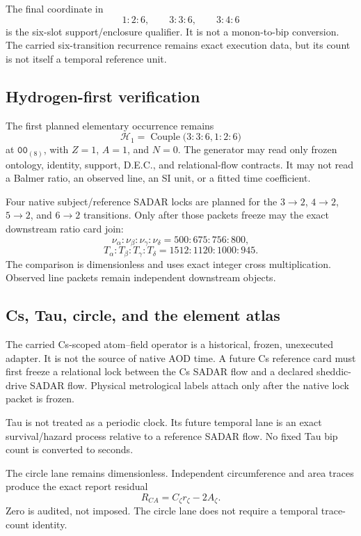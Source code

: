 The final coordinate in
\[
1{:}2{:}6,\qquad 3{:}3{:}6,\qquad 3{:}4{:}6
\]
is the six-slot support/enclosure qualifier.  It is not a monon-to-bip
conversion.  The carried six-transition recurrence remains exact execution
data, but its count is not itself a temporal reference unit.

\subsection{Hydrogen-first verification}

The first planned elementary occurrence remains
\[
\boxed{
\mathcal H_1=
\operatorname{Couple}
\bigl(3{:}3{:}6,1{:}2{:}6\bigr)
}
\]
at \(\mathtt{00}_{(8)}\), with \(Z=1\), \(A=1\), and \(N=0\).
The generator may read only frozen ontology, identity, support, D.E.C., and
relational-flow contracts.  It may not read a Balmer ratio, an observed line,
an SI unit, or a fitted time coefficient.

Four native subject/reference SADAR locks are planned for the
\(3\to2\), \(4\to2\), \(5\to2\), and \(6\to2\) transitions.  Only after
those packets freeze may the exact downstream ratio card join:
\[
\nu_\alpha:\nu_\beta:\nu_\gamma:\nu_\delta
 =500:675:756:800,
\]
\[
T_\alpha:T_\beta:T_\gamma:T_\delta
 =1512:1120:1000:945.
\]
The comparison is dimensionless and uses exact integer cross multiplication.
Observed line packets remain independent downstream objects.

\subsection{Cs, Tau, circle, and the element atlas}

The carried Cs-scoped atom--field operator is a historical, frozen, unexecuted
adapter.  It is not the source of native AOD time.  A future Cs reference card
must first freeze a relational lock between the Cs SADAR flow and a declared
sheddic-drive SADAR flow.  Physical metrological labels attach only after the
native lock packet is frozen.

Tau is not treated as a periodic clock.  Its future temporal lane is an exact
survival/hazard process relative to a reference SADAR flow.  No fixed Tau bip
count is converted to seconds.

The circle lane remains dimensionless.  Independent circumference and area
traces produce the exact report residual
\[
R_{CA}=C_\zeta r_\zeta-2A_\zeta.
\]
Zero is audited, not imposed.  The circle lane does not require a temporal
trace-count identity.

